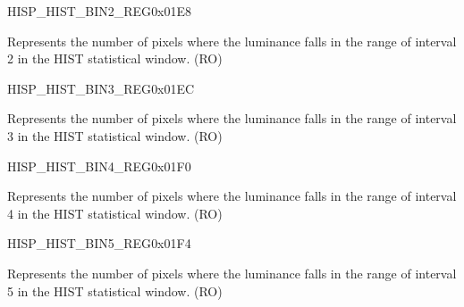 \begin{register}{H}{ISP\_HIST\_BIN2\_REG}{0x01E8}\label{regdesc:ISPHISTBIN2REG}
%
%
\regnewline%
\begin{regdesc}\begin{reglist}
\label{fielddesc:ISPHISTBIN2}\item [ISP\_HIST\_BIN\_2] Represents the number of pixels where the luminance falls in the range of interval 2 in the HIST statistical window. (RO)
\end{reglist}\end{regdesc}
\end{register}


\begin{register}{H}{ISP\_HIST\_BIN3\_REG}{0x01EC}\label{regdesc:ISPHISTBIN3REG}
%
%
\regnewline%
\begin{regdesc}\begin{reglist}
\label{fielddesc:ISPHISTBIN3}\item [ISP\_HIST\_BIN\_3] Represents the number of pixels where the luminance falls in the range of interval 3 in the HIST statistical window. (RO)
\end{reglist}\end{regdesc}
\end{register}


\begin{register}{H}{ISP\_HIST\_BIN4\_REG}{0x01F0}\label{regdesc:ISPHISTBIN4REG}
%
%
\regnewline%
\begin{regdesc}\begin{reglist}
\label{fielddesc:ISPHISTBIN4}\item [ISP\_HIST\_BIN\_4] Represents the number of pixels where the luminance falls in the range of interval 4 in the HIST statistical window. (RO)
\end{reglist}\end{regdesc}
\end{register}


\begin{register}{H}{ISP\_HIST\_BIN5\_REG}{0x01F4}\label{regdesc:ISPHISTBIN5REG}
%
%
\regnewline%
\begin{regdesc}\begin{reglist}
\label{fielddesc:ISPHISTBIN5}\item [ISP\_HIST\_BIN\_5] Represents the number of pixels where the luminance falls in the range of interval 5 in the HIST statistical window. (RO)
\end{reglist}\end{regdesc}
\end{register}


